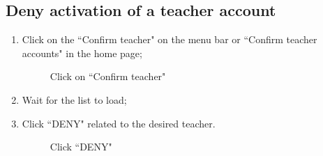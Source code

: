 \documentclass[ManualeUtente]{subfiles}
\begin{document}
\subsection{Deny activation of a teacher account}
\begin{enumerate}
	\item Click on the \textquotedblleft Confirm teacher" on the menu bar or \textquotedblleft Confirm teacher accounts" in the home page;
	\begin{figure}[H]
		\centering
		\caption{Click on ``Confirm teacher"}
		\label{fig:Click on "Confirm teacher"}
	\end{figure}
	\item Wait for the list to load;
	\item Click \textquotedblleft DENY" related to the desired teacher.
	\begin{figure}[H]
		\centering
		\caption{Click ``DENY"}
		\label{fig:Click "DENY"}
	\end{figure}
\end{enumerate}
\end{document}
